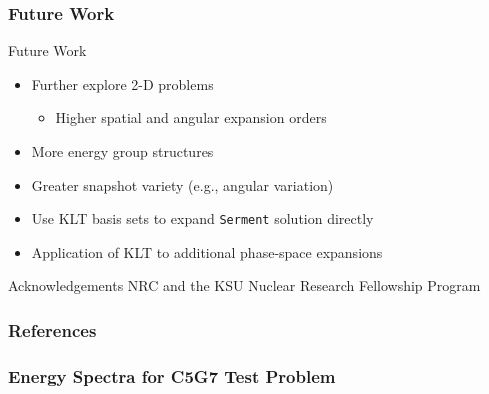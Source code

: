 \documentclass[fleqn]{beamer}
\begin{document}
        \begin{frame}
            \frametitle{Future Work}
            \begin{block}{Future Work}
                \begin{itemize}
                    \item Further explore 2-D problems
                    \begin{itemize}
                        \item Higher spatial and angular expansion orders
                    \end{itemize}
                    \item More energy group structures
                    \item Greater snapshot variety (e.g., angular variation)
                    \item Use KLT basis sets to expand {\tt Serment} solution
                    directly
                    \item Application of KLT to additional phase-space
                    expansions
                \end{itemize}
            \end{block}
            \begin{block}{Acknowledgements}
                NRC and the KSU Nuclear Research Fellowship Program
            \end{block}

            \nocite{*}
        \end{frame}

        \begin{frame}[t,allowframebreaks]\label{lastframe}
            \frametitle{References}
            
            {\scriptsize }
        \end{frame}

        \beginbackup

        \begin{frame}[noframenumbering]
            \frametitle{Energy Spectra for C5G7 Test Problem}
            \centering
            \begin{figure}
                \begin{columns}[T]
                    \begin{column}{0.5\textwidth}
                    \end{column}
                \end{columns}
            \end{figure}
  \end{frame}

  \backupend
\end{document}
